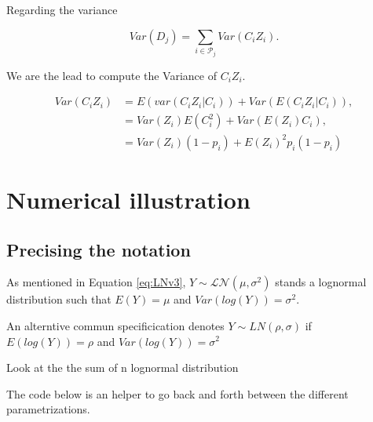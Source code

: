 \documentclass[
]{book}
\begin{document}
Regarding the variance

\[Var(D_j)  = \sum_{i\in \mathcal{P}_j} Var(C_i Z_i).\]

We are the lead to compute the Variance of \(C_i Z_i\).

\begin{align*}
Var(C_i Z_i) & = E( var(C_i Z_i \vert C_i) )  + Var( E(C_i Z_i \vert C_i) ),\\
& = Var(Z_i) E(C_i^2) + Var ( E(Z_i) C_i),\\
& = Var(Z_i) (1-p_i) + E(Z_i)^2 p_i (1-p_i)
\end{align*}

\hypertarget{numerical-illustration}{%
\section{Numerical illustration}\label{numerical-illustration}}

\hypertarget{precising-the-notation}{%
\subsection{Precising the notation}\label{precising-the-notation}}

As mentioned in Equation \eqref{eq:LNv3}, \(Y\sim \mathcal{LN}(\mu, \sigma^2)\) stands a lognormal distribution such that \(E(Y) = \mu\) and \(Var(log(Y)) = \sigma^2\).

An alterntive commun specificication denotes \(Y \sim LN(\rho, \sigma)\) if \(E(log(Y))=\rho\) and \(Var(log(Y)) = \sigma^2\)

Look at the the sum of n lognormal distribution

The code below is an helper to go back and forth between the different parametrizations.
\end{document}
